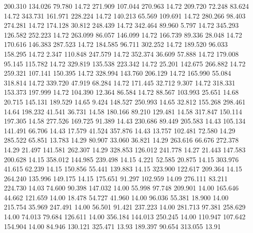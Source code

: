  200.310  134.026   79.780        14.72
 271.909  107.044  270.963        14.72
 209.720   72.248   83.624        14.72
 343.731  161.971  228.224        14.72
 140.213   65.569  109.691        14.72
 280.266   98.403  274.281        14.72
 174.128   30.812  248.439        14.72
 342.464   89.960    5.797        14.72
 345.293  126.582  252.223        14.72
 263.099   86.057  146.099        14.72
 166.739   89.336   28.048        14.72
 170.616  146.383  287.523        14.72
 184.585   96.711  302.252        14.72
 189.520   96.033  158.295        14.72
   2.347  110.848  247.579        14.72
 352.374   36.609   57.888        14.72
 179.008   95.145  115.782        14.72
 329.819  135.538  223.342        14.72
  25.201  142.675  266.882        14.72
 259.321  107.141  150.395        14.72
 328.994  143.760  206.129        14.72
 165.990   55.084  318.814        14.72
 339.720   47.919   68.284        14.72
 171.445   32.712    9.307        14.72
 318.331  153.373  197.999        14.72
 104.390   12.364   86.584        14.72
  88.567  103.993   25.651        14.68
  20.715  145.131  189.529        14.65
   9.424  148.527  250.993        14.65
  32.812  155.268  298.461        14.64
 198.232   41.541   36.731        14.58
 180.166   89.210  129.481        14.58
 317.847  150.114  197.305        14.58
 277.526  169.725   91.389        14.43
 230.686   89.449  205.583        14.43
 105.134  141.491   66.706        14.43
  17.579   41.524  357.876        14.43
  13.757  102.481   72.580        14.29
 285.522   65.851   13.783        14.29
  80.907   33.060   36.821        14.29
 263.616   66.676  272.378        14.29
  21.497  141.581  262.307        14.29
 328.853  126.012  241.778        14.27
  21.443  147.583  200.628        14.15
 358.012  144.985  239.498        14.15
   4.221   52.585   20.875        14.15
 303.976   41.615   62.239        14.15
 150.856   55.441  139.883        14.15
 323.900  122.617  209.364        14.15
 264.240  135.996  149.175        14.15
 175.651   91.297  102.959        14.09
 276.111   83.211  224.730        14.03
  74.600   90.398  147.032        14.00
  55.998   97.748  209.901        14.00
 165.646   44.662  121.659        14.00
  18.478   54.727   41.960        14.00
  96.036   55.381   18.900        14.00
 215.754   35.969  247.491        14.00
  56.501   91.421  237.223        14.00
 281.713   97.381  258.629        14.00
  74.013   79.684  126.611        14.00
 356.184  144.013  250.245        14.00
 110.947  107.642  154.904        14.00
  84.946  130.121  325.471        13.93
 189.397   90.654  313.055        13.91
